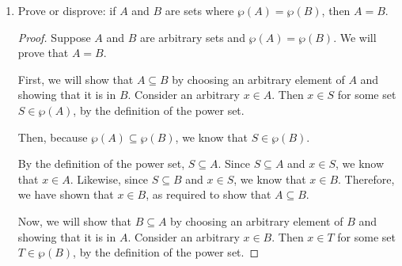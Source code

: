 \documentclass{article}
\renewcommand{\(}{\left(}
\renewcommand{\)}{\right)}
\renewcommand{\emptyset}{\text{\O}}
\theoremstyle{plain}
\theoremstyle{plain}
\theoremstyle{definition}
\begin{document}
\begin{enumerate}[label*=\roman*.,ref=\roman*]
\begin{shaded}
\begin{proof}[Disproof]
	Next, we will show that $B - C \subseteq A - C$. Now consider an arbitrary $x \in B$. Since $B \subset C$, we know that $x \in C$. But since we know that $$B - C = \{x: x \in B \land x \notin C \},$$ then $x \notin B-C$. So $B - C = \emptyset$, and since $\emptyset \subseteq A - C$, $ B - C \subseteq A - C$.
	
	Since $A - C \subseteq B - C$ and $B - C \subseteq A - C$, we conclude that $A - C = B - C$.
	
	We now show that $A \neq B$. Assume, for the sake of contradiction, that $A \subseteq B$. Pick an arbitrary $x \in A$. Then because $x \in A$ and $A \subseteq B$, then $x \in B$. But that would  mean that $x \in A \cap B$, and we know that $A \cap B = \emptyset$. Therefore, our assumption produces an absurdity, and we conclude that $A \not\subseteq B$.
	
	We conclude by a symmetrical argument that $B \not\subseteq A$, and so $A \neq B$.
	
	We have shown that there exist sets $A$, $B$, and $C$ such that $A - C = B - C$ and $A \neq B$, so the negation of the statement is true.
\end{proof}
\end{shaded}

\item Prove or disprove: if $A$ and $B$ are sets where $\wp(A) = \wp(B)$, then $A = B$.

\begin{shaded}
\begin{proof}
Suppose $A$ and $B$ are arbitrary sets and $\wp(A) = \wp(B)$. We will prove that $A = B$.

First, we will show that $A \subseteq B$ by choosing an arbitrary element of $A$ and showing that it is in $B$. Consider an arbitrary $x \in A$. Then $x \in S$ for some set $S \in \wp(A)$, by the definition of the power set.

Then, because $\wp(A) \subseteq \wp(B)$, we know that $S \in \wp(B)$. 

By the definition of the power set, $S \subseteq A$. Since $S \subseteq A$ and $x \in S$, we know that $x \in A$. Likewise, since $S \subseteq B$ and $x \in S$, we know that $x \in B$. Therefore, we have shown that $x \in B$, as required to show that $A \subseteq B$.

Now, we will show that $B \subseteq A$ by choosing an arbitrary element of $B$ and showing that it is in $A$. Consider an arbitrary $x \in B$. Then $x \in T$ for some set $T \in \wp(B)$, by the definition of the power set.


\end{proof}
\end{shaded}
\end{enumerate}
\end{document}
